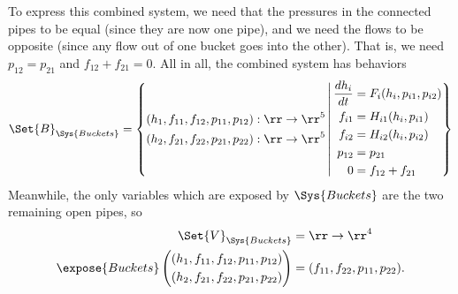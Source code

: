 \documentclass[DynamicalBook]{subfiles}
\begin{document}
To express this combined system, we need that the pressures in the connected
pipes to be equal (since they are now one pipe), and we need the flows to be opposite (since any flow out of one
bucket goes into the other). That is, we need $p_{12} = p_{21}$ and $f_{12} +
f_{21} = 0$. All in all, the combined system has behaviors
\begin{equation}\label{eqn:combined.bucket.system}
  \Set{B}_{\Sys{Buckets}} = \left\{ \begin{aligned}
      (h_1, f_{11}, f_{12}, p_{11}, p_{12}) &: \rr \to \rr^5\\
      (h_2, f_{21}, f_{22}, p_{21}, p_{22}) &: \rr \to \rr^5\\
    \end{aligned}\,\middle|\,
\begin{aligned}
  \frac{dh_i}{dt} &= F_i(h_i, p_{i1}, p_{i2}) \\
  f_{i1} &= H_{i1}(h_i, p_{i1})\\
  f_{i2} &= H_{i2}(h_i, p_{i2})\\
  p_{12} &= p_{21} \\
  0 &= f_{12} + f_{21}
\end{aligned}
  \right\}
  \end{equation}
Meanwhile, the only variables which are exposed by $\Sys{Buckets}$ are the two
remaining open pipes, so
\begin{align*}
  \Set{V}_{\Sys{Buckets}} &= \rr \to \rr^4 \\
  \expose{Buckets}\left(\begin{aligned}
      (h_1, f_{11}, f_{12}, p_{11}, p_{12}) \\
      (h_2, f_{21}, f_{22}, p_{21}, p_{22})\\
    \end{aligned}  \right) &= (f_{11}, f_{22}, p_{11}, p_{22}).
\end{align*}
\end{document}
